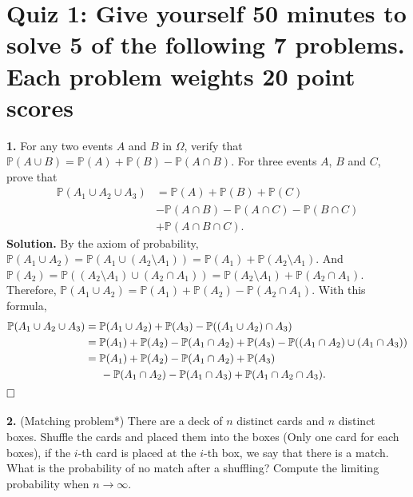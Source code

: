 \documentclass[12pt]{article}
\begin{document}
\section*{Quiz 1: Give yourself 50 minutes to solve 5 of the following 7 problems. Each problem weights 20 point scores}
\textbf{1.} For any two events $A$ and $B$ in $\Omega$, verify that $\mathbb{P}(A\cup B)=\mathbb{P}(A)+ \mathbb{P}(B)- \mathbb{P}(A\cap B)$.
For three events $A$, $B$ and $C$, prove that
\begin{equation*}
\begin{aligned}
\mathbb{P}(A_1\cup A_2\cup A_3) &= \mathbb{P}(A)+\mathbb{P}(B)+\mathbb{P}(C) \\&
-\mathbb{P}(A\cap B)-\mathbb{P}(A\cap C)-\mathbb{P}(B\cap C) \\&
+\mathbb{P}(A\cap B\cap C).
\end{aligned}
\end{equation*}
\textbf{Solution.} By the axiom of probability, $\mathbb{P}(A_1\cup A_2)=\mathbb{P}(A_1\cup(A_2\setminus A_1))=\mathbb{P}(A_1)+\mathbb{P}(A_2\setminus A_1)$. And $\mathbb{P}(A_2)=\mathbb{P}((A_2\setminus A_1)\cup(A_2\cap A_1))=\mathbb{P}(A_2\setminus A_1)+\mathbb{P}(A_2\cap A_1)$. Therefore, $\mathbb{P}(A_1\cup A_2)=\mathbb{P}(A_1)+\mathbb{P}(A_2)-\mathbb{P}(A_2\cap A_1)$. With this formula,
\begin{equation*}
\begin{aligned}
\mathbb{P}(A_1\cup A_2\cup A_3) &= \mathbb{P}(A_1\cup A_2)+\mathbb{P}(A_3)-\mathbb{P}((A_1\cup A_2)\cap A_3) \\&
=\mathbb{P}(A_1)+\mathbb{P}(A_2)-\mathbb{P}(A_1\cap A_2)+\mathbb{P}(A_3)-\mathbb{P}((A_1\cap A_2)\cup(A_1\cap A_3)) \\&
=\mathbb{P}(A_1)+\mathbb{P}(A_2)-\mathbb{P}(A_1\cap A_2)+\mathbb{P}(A_3)
\\&
\hspace{5mm}-\mathbb{P}(A_1\cap A_2)-\mathbb{P}(A_1\cap A_3)+\mathbb{P}(A_1\cap A_2\cap A_3).
\end{aligned}
\end{equation*}
$\hspace{\fill}\square$
\\ \\
\textbf{2.} (Matching problem*) There are a deck of $n$ distinct cards and $n$ distinct boxes. Shuffle
the cards and placed them into the boxes (Only one card for each boxes), if the $i$-th card
is placed at the $i$-th box, we say that there is a match. What is the probability of no
match after a shuffling? Compute the limiting probability when $n\rightarrow\infty$.
\end{document}
